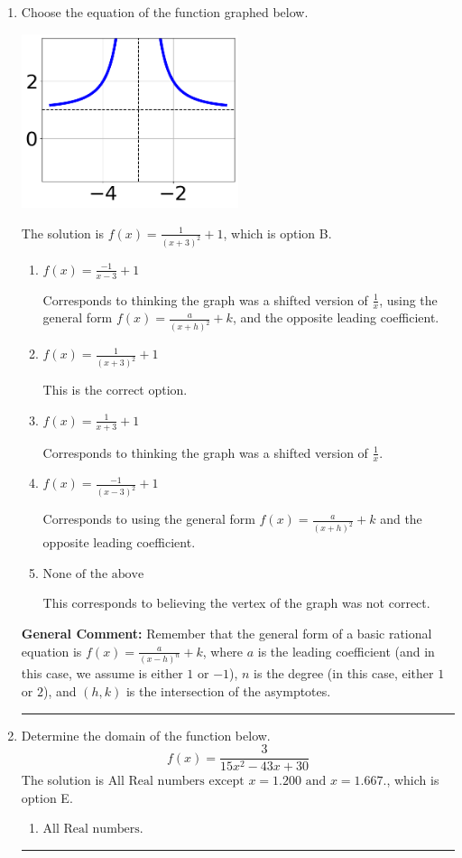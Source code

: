 \documentclass{extbook}[14pt]
\newcommand{\litem}[1]{\item #1

\rule{\textwidth}{0.4pt}}
\begin{document}
\begin{enumerate}\litem{
Choose the equation of the function graphed below.

\begin{center}
    \includegraphics[width=0.5\textwidth]{../Figures/rationalGraphToEquationA.png}
\end{center}


The solution is \( f(x) = \frac{1}{(x + 3)^2} + 1 \), which is option B.\begin{enumerate}[label=\Alph*.]
\item \( f(x) = \frac{-1}{x - 3} + 1 \)

Corresponds to thinking the graph was a shifted version of $\frac{1}{x}$, using the general form $f(x) = \frac{a}{(x+h)^2}+k$, and the opposite leading coefficient.
\item \( f(x) = \frac{1}{(x + 3)^2} + 1 \)

This is the correct option.
\item \( f(x) = \frac{1}{x + 3} + 1 \)

Corresponds to thinking the graph was a shifted version of $\frac{1}{x}$.
\item \( f(x) = \frac{-1}{(x - 3)^2} + 1 \)

Corresponds to using the general form $f(x) = \frac{a}{(x+h)^2}+k$ and the opposite leading coefficient.
\item \( \text{None of the above} \)

This corresponds to believing the vertex of the graph was not correct.
\end{enumerate}

\textbf{General Comment:} Remember that the general form of a basic rational equation is $ f(x) = \frac{a}{(x-h)^n} + k$, where $a$ is the leading coefficient (and in this case, we assume is either $1$ or $-1$), $n$ is the degree (in this case, either $1$ or $2$), and $(h, k)$ is the intersection of the asymptotes.
}
\litem{
Determine the domain of the function below.
\[ f(x) = \frac{3}{15x^{2} -43 x + 30} \]The solution is \( \text{All Real numbers except } x = 1.200 \text{ and } x = 1.667. \), which is option E.\begin{enumerate}[label=\Alph*.]
\item \( \text{All Real numbers.} \)


\end{enumerate}}
\end{enumerate}
\end{document}
